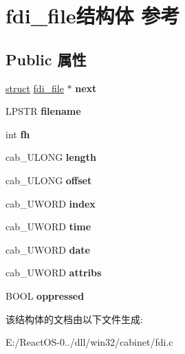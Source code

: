 \hypertarget{structfdi__file}{}\section{fdi\+\_\+file结构体 参考}
\label{structfdi__file}
\subsection*{Public 属性}
\begin{DoxyCompactItemize}
\item 
\mbox{\label{structfdi__file_ab2cb163d3ed96152fda95605a601c5b3}} 
\hyperlink{interfacestruct}{struct} \hyperlink{structfdi__file}{fdi\+\_\+file} $\ast$ {\bfseries next}
\item 
\mbox{\label{structfdi__file_ac12e8708936ec994b232706c2e7b990c}} 
L\+P\+S\+TR {\bfseries filename}
\item 
\mbox{\label{structfdi__file_afb08d8e3f34e89a4cd40bbad8ee56a5a}} 
int {\bfseries fh}
\item 
\mbox{\label{structfdi__file_a1b787703ac6a3b2bafad88edd84a6c02}} 
cab\+\_\+\+U\+L\+O\+NG {\bfseries length}
\item 
\mbox{\label{structfdi__file_adb6a8a5dad57879760be81ebcb663672}} 
cab\+\_\+\+U\+L\+O\+NG {\bfseries offset}
\item 
\mbox{\label{structfdi__file_aab9b15fa04c61ba1c2ad805864d41554}} 
cab\+\_\+\+U\+W\+O\+RD {\bfseries index}
\item 
\mbox{\label{structfdi__file_a161374f6be2eeb33e7e94fba82632a22}} 
cab\+\_\+\+U\+W\+O\+RD {\bfseries time}
\item 
\mbox{\label{structfdi__file_a4caceeecfb04d531055753ad9f17cd32}} 
cab\+\_\+\+U\+W\+O\+RD {\bfseries date}
\item 
\mbox{\label{structfdi__file_a078c0d4e9c8e05b02b82e36fe25b3fc0}} 
cab\+\_\+\+U\+W\+O\+RD {\bfseries attribs}
\item 
\mbox{\label{structfdi__file_af94c99baac0705665ad904fddc53a643}} 
B\+O\+OL {\bfseries oppressed}
\end{DoxyCompactItemize}


该结构体的文档由以下文件生成\+:\begin{DoxyCompactItemize}
\item 
E\+:/\+React\+O\+S-\/0../dll/win32/cabinet/fdi.\+c\end{DoxyCompactItemize}
